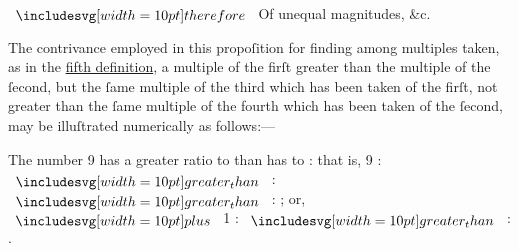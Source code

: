 \documentclass[12pt,preview]{standalone}
\begin{document}
\begin{minipage}{\textwidth}
    \hfill

    $\btherefore$ Of unequal magnitudes, \&c.

    \hfill

    \raggedright The contrivance employed in this propoſition for finding among multiples taken, as in the \hyperref[book5def5]{fifth definition}, a multiple of the firſt greater than the multiple of the ſecond, but the ſame multiple of the third which has been taken of the firſt, not greater than the ſame multiple of the fourth which has been taken of the ſecond, may be illuſtrated numerically as follows:---\\

    \hfill

    The number 9 has a greater ratio to {\color{cblue}{7}} than {\color{cyellow}{8}} has to {\color{cblue}{7}}: that is, 9 : {\color{cblue}{7}} $\bgt$ {\color{cyellow}{8}} : {\color{cblue}{7}} $\bgt$ {\color{cyellow}{8}} : {\color{cblue}{7}}; or, {\color{cred}{8}} $\bplus$ 1 : {\color{cblue}{7}} $\bgt$ {\color{cyellow}{8}} : {\color{cblue}{7}}.\\
\end{minipage}

\newpage
\end{document}
